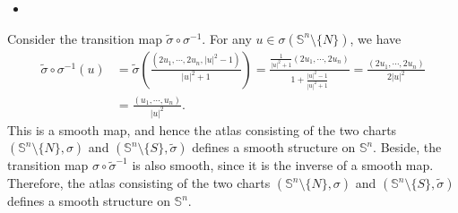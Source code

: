 \begin{itemize}
    \item [(c)]
\end{itemize}
Consider the transition map $\tilde{\sigma}\circ \sigma^{-1}$. For any $u\in \sigma(\mathbb{S}^n\setminus \{N\})$, we have
\begin{align}
    \tilde{\sigma}\circ \sigma^{-1}(u)&=\tilde{\sigma}\left(\frac{(2u_1,\cdots,2u_n, |u|^2-1)}{|u|^2+1}\right)
    =\frac{\frac{1}{|u|^2+1}(2u_1,\cdots,2u_n)}{1+\frac{|u|^2-1}{|u|^2+1}}
    =\frac{(2u_1,\cdots,2u_n)}{2 |u|^2}\\
    &=\frac{(u_1,\cdots,u_n)}{|u|^2}.
\end{align}
This is a smooth map, and hence the atlas consisting of the two charts $(\mathbb{S}^n\setminus \{N\},\sigma)$ and $(\mathbb{S}^n\setminus \{S\},\tilde{\sigma})$ defines a smooth structure on $\mathbb{S}^n$. Beside, the transition map $\sigma\circ \tilde{\sigma}^{-1}$ is also smooth, since it is the inverse of a smooth map. Therefore, the atlas consisting of the two charts $(\mathbb{S}^n\setminus \{N\},\sigma)$ and $(\mathbb{S}^n\setminus \{S\},\tilde{\sigma})$ defines a smooth structure on $\mathbb{S}^n$.

